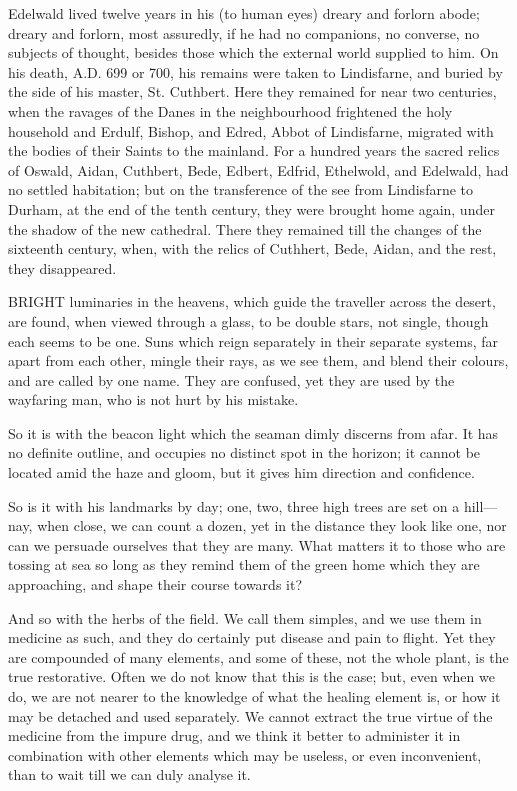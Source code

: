 Edelwald lived twelve years in his (to human
eyes) dreary and forlorn abode; dreary and forlorn, most assuredly, if
he had no companions, no converse, no subjects of thought, besides
those which the external world supplied to him. On his death, A.D.
699 or 700, his remains were taken to Lindisfarne, and buried by the
side of his master, St. Cuthbert. Here they remained for near two
centuries, when the ravages of the Danes in the neighbourhood
frightened the holy household and Erdulf, Bishop, and Edred, Abbot of
Lindisfarne, migrated with the bodies of their Saints to the mainland.
For a hundred years the sacred relics of Oswald, Aidan, Cuthbert, Bede,
Edbert, Edfrid, Ethelwold, and Edelwald, had no settled habitation;
but on the transference of the see from Lindisfarne to Durham, at the
end of the tenth century, they were brought home again, under the
shadow of the new cathedral. There they remained till the changes of
the sixteenth century, when, with the relics of Cuthhert, Bede, Aidan,
and the rest, they disappeared.



BRIGHT
luminaries in the heavens, which guide the traveller across the
desert, are found, when viewed through a glass, to be double stars,
not single, though each seems to be one. Suns which reign separately
in their separate systems, far apart from each other, mingle their
rays, as we see them, and blend their colours, and are called by one
name. They are confused, yet they are used by the wayfaring man, who
is not hurt by his mistake.

So it is with the beacon light which the seaman
dimly discerns from afar. It has no definite outline, and occupies no
distinct spot in the horizon; it cannot be located amid the haze and
gloom, but it gives him direction and confidence.

So is it with his landmarks by day; one, two,
three high trees are set on a hill—nay, when close, we can count a
dozen, yet in the distance they look like one, nor can we persuade
ourselves that they are many. What matters it to those who are tossing
at sea so long as they remind them of the green home which they are
approaching, and shape their course towards it?

And so with the herbs of the field. We call them
simples, and we use them in medicine as such, and they do certainly
put disease and pain to flight. Yet they are compounded of many
elements, and some of these, not the whole plant, is the true
restorative. Often we do not know that this is the case; but, even
when we do, we are not nearer to the knowledge of what the healing
element is, or how it may be detached and used separately. We cannot
extract the true virtue of the medicine from the impure drug, and we
think it better to administer it in combination with other elements
which may be useless, or even inconvenient, than to wait till we can
duly analyse it.

